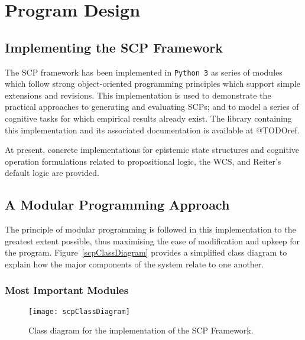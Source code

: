 \chapter{Program Design} \label{chp:program}
\section{Implementing the SCP Framework}
The SCP framework has been implemented in \texttt{Python 3} as series of modules which follow strong object-oriented programming principles which support simple extensions and revisions. This implementation is used to demonstrate the practical approaches to generating and evaluating SCPs; and to model a series of cognitive tasks for which empirical results already exist. The library containing this implementation and its associated documentation is available at @TODOref.

At present, concrete implementations for epistemic state structures and cognitive operation formulations related to propositional logic, the WCS, and Reiter's default logic are provided.

\section{A Modular Programming Approach}
The principle of modular programming is followed in this implementation to the greatest extent possible, thus maximising the ease of modification and upkeep for the program. Figure~\ref{scpClassDiagram} provides a simplified class diagram to explain how the major components of the system relate to one another.

\subsection{Most Important Modules}

\begin{figure}
\centering \texttt{[image: scpClassDiagram]}
\caption{Class diagram for the implementation of the SCP Framework.}
\label{fig:scpClassDiagram}
\end{figure}

